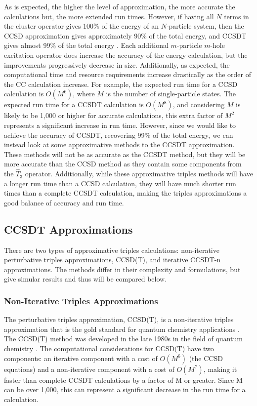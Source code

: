 As is expected, the higher the level of approximation, the more accurate the calculations but, the more extended run times. However, if having all $N$ terms in the cluster operator gives 100$\%$ of the energy of an $N$-particle system, then the CCSD approximation gives approximately 90$\%$ of the total energy, and CCSDT gives almost 99$\%$ of the total energy \cite{Ref21}. Each additional $m$-particle $m$-hole excitation operator does increase the accuracy of the energy calculation, but the improvements progressively decrease in size. Additionally, as expected, the computational time and resource requirements increase drastically as the order of the CC calculation increase. For example, the expected run time for a CCSD calculation is $O(M^6)$, where $M$ is the number of single-particle states. The expected run time for a CCSDT calculation is $O(M^8)$, and considering $M$ is likely to be 1,000 or higher for accurate calculations, this extra factor of $M^2$ represents a significant increase in run time. However, since we would like to achieve the accuracy of CCSDT, recovering 99$\%$ of the total energy, we can instead look at some approximative methods to the CCSDT approximation. These methods will not be as accurate as the CCSDT method, but they will be more accurate than the CCSD method as they contain some components from the $\hat{T}_3$ operator. Additionally, while these approximative triples methods will have a longer run time than a CCSD calculation, they will have much shorter run times than a complete CCSDT calculation, making the triples approximations a good balance of accuracy and run time.


\subsection{CCSDT Approximations}
There are two types of approximative triples calculations: non-iterative perturbative triples approximations, CCSD(T), and iterative CCSDT-n approximations.  The methods differ in their complexity and formulations, but give simular results and thus will be compared below.
    
	\subsubsection{Non-Iterative Triples Approximations}
    The perturbative triples approximation, CCSD(T), is a non-iterative triples approximation that is the gold standard for quantum chemistry applications \cite{Ref16}. The CCSD(T) method was developed in the late 1980s in the field of quantum chemistry \cite{Ref158}. The computational considerations for CCSD(T) have two components: an iterative component with a cost of $O(M^6)$ (the CCSD equations) and a non-iterative component with a cost of $O(M^7)$, making it faster than complete CCSDT calculations by a factor of M or greater. Since M can be over 1,000, this can represent a significant decrease in the run time for a calculation.
    
